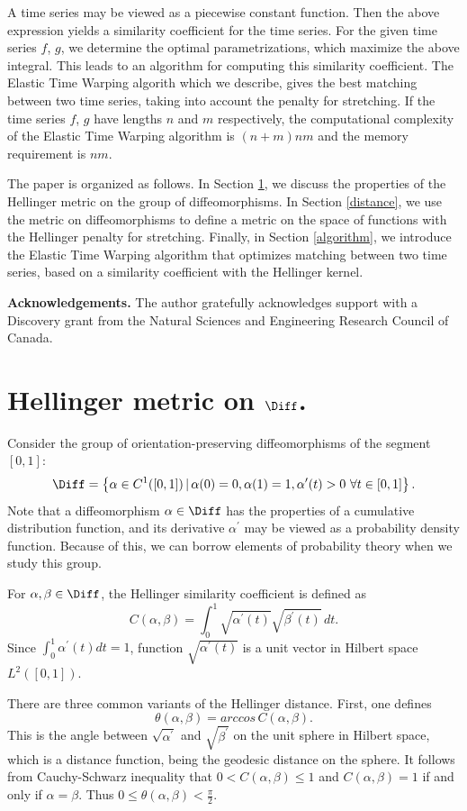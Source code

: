 \documentclass[12pt]{amsart}
\begin{document}
A time series may be viewed as a piecewise constant function. Then the above expression yields a similarity coefficient for the time series.
For the given time series $f$, $g$, we determine the optimal parametrizations, which maximize the above integral. 
This leads to an algorithm for computing this similarity coefficient. The Elastic Time Warping algorith which we describe, gives 
the best matching between two time series, taking into account the penalty for stretching. If the time series $f$, $g$ have lengths $n$ and $m$ respectively, the computational complexity of the Elastic Time Warping algorithm is $(n+m)nm$ and the memory requirement is $n m$.

The paper is organized as follows. In Section \ref{Hellinger}, we discuss the properties of the Hellinger metric on the group of diffeomorphisms. In Section \ref{distance}, we use the metric on diffeomorphisms to define a metric on the space of functions with the Hellinger penalty for stretching. Finally, in Section \ref{algorithm}, we introduce the Elastic Time Warping algorithm that optimizes matching between two time series, based on a similarity coefficient with the Hellinger kernel.

{\bf Acknowledgements.} The author gratefully acknowledges support with a Discovery grant from the Natural Sciences and Engineering Research Council of Canada.

\section{Hellinger metric on $\Diff$.}
\label{Hellinger}

Consider the group of orientation-preserving diffeomorphisms of the segment $[0,1]$:
\[\Diff = \left\{ \alpha \in C^1([0,1]) \, | \, \alpha(0) = 0, \alpha(1) = 1, \alpha^\prime(t) > 0 \ \forall t \in [0,1] \right\}.\]
Note that a diffeomorphism $\alpha \in \Diff$ has the properties of a cumulative distribution function, and its derivative
$\alpha^\prime$ may be viewed as a probability density function. Because of this, we can borrow elements of probability theory when we study this group.

For $\alpha, \beta \in \Diff$, the Hellinger similarity coefficient is defined as 
\[C(\alpha, \beta) = \int_0^1 \sqrt{\alpha^\prime (t)} \sqrt{\beta^\prime (t)} \,dt.\]
Since $\int_0^1 \alpha^\prime (t) dt = 1$, function $\sqrt{\alpha^\prime (t)}$ is a unit vector in Hilbert space $L^2([0,1])$.

There are three common variants of the Hellinger distance. First, one defines 
\[\theta(\alpha, \beta) = arccos \, C(\alpha, \beta).\]
This is the angle between $\sqrt{\alpha^\prime}$ and  $\sqrt{\beta^\prime}$ on the unit sphere in Hilbert space, which is a distance function, being the geodesic distance on the sphere. It follows from Cauchy-Schwarz inequality that $0 < C(\alpha, \beta) \leq 1$ and $C(\alpha, \beta) = 1$ if and only if $\alpha = \beta$. Thus $0 \leq \theta(\alpha, \beta) < \frac{\pi}{2}$.
\end{document}
